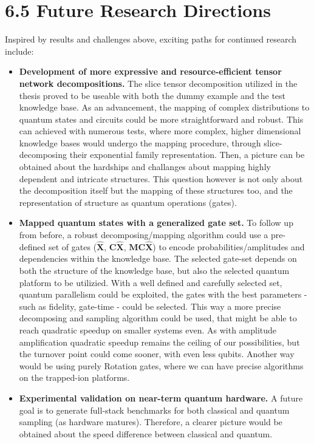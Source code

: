 \documentclass[encoding=utf8,british]{tumphthesis}
\begin{document}
    \section*{6.5 Future Research Directions}
    Inspired by results and challenges above, exciting paths for continued research include:
    \begin{itemize}
        \item \textbf{Development of more expressive and resource-efficient tensor network decompositions.} The slice tensor decomposition utilized in the thesis proved to be useable with both the dummy example and the test knowledge base. 
        As an advancement, the mapping of complex distributions to quantum states and circuits could be more straightforward and robust. This can achieved with numerous tests, where more complex, higher dimensional
        knowledge bases would undergo the mapping procedure, through slice-decomposing their exponential family representation. Then, a picture can be obtained about the hardships and challanges about mapping
        highly dependent and intricate structures. This question however is not only about the decomposition itself but the mapping of these structures too, and the representation of structure as quantum operations (gates).
        \item \textbf{Mapped quantum states with a generalized gate set.} To follow up from before, a robust decomposing/mapping algorithm could use a pre-defined set of gates ($\mathbf{\hat{X}}$, $\mathbf{C\hat{X}}$, $\mathbf{MC\hat{X}}$) to encode probabilities/amplitudes and dependencies within the knowledge base.
        The selected gate-set depends on both the structure of the knowledge base, but also the selected quantum platform to be utilizied. With a well defined and carefully selected set, quantum parallelism could be exploited, the gates with the best parameters - such as fidelity, gate-time - could 
        be selected. This way a more precise decomposing and sampling algorithm could be used, that might be able to reach quadratic speedup on smaller systems even. As with amplitude amplification quadratic speedup remains the ceiling of our possibilities, but the turnover point could come sooner, with even less qubits.
        Another way would be using purely Rotation gates, where we can have precise algorithms on the trapped-ion platforms.
        \item \textbf{Experimental validation on near-term quantum hardware.} A future goal is to generate full-stack benchmarks for both classical and quantum sampling (as hardware matures). Therefore, a clearer picture would be obtained about the speed difference between classical and quantum.

\end{itemize}
\end{document}

